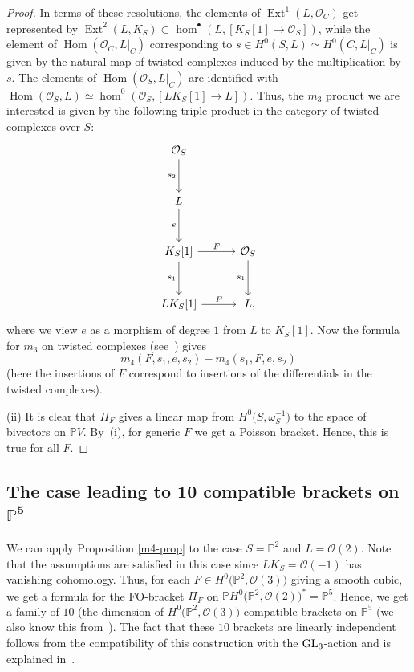 \documentclass[pdftex]{sigma}
\numberwithin{equation}{section}
\renewcommand{\P}{{\mathbb P}}
\newcommand{\Hom}{\operatorname{Hom}}
\newcommand{\Ext}{\operatorname{Ext}}
\newcommand{\OO}{{\mathcal O}}
\newcommand{\sub}{\subset}
\newcommand{\om}{\omega}
\begin{document}
\begin{proof}
In terms of these resolutions, the elements of $\Ext^1(L,\OO_C)$ get represented by $\Ext^2(L,K_S)\sub \hom^\bullet(L,[K_S[1]\to \OO_S])$,
while the element of $\Hom(\OO_C,L|_C)$ corresponding to $s\in H^0(S,L)\simeq H^0(C,L|_C)$ is given by the natural map of twisted complexes
induced by the multiplication by~$s$. The elements of $\Hom(\OO_S,L|_C)$ are identified with $\Hom(\OO_S,L)\simeq \hom^0(\OO_S,[LK_S[1]\to L])$.
Thus, the $m_3$ product we are interested is given by the following triple product in the category of twisted complexes over $S$:
\[
\begin{tikzcd}[row sep=3em,column sep=3em]
\OO_S \arrow[d,"s_2"'] & \\
L \arrow[d,"e"'] & \\
K_S[1] \arrow[r,"F"]\arrow[d,"s_1"'] & \OO_S \arrow[d,"s_1"']\\
LK_S[1]\arrow[r,"F"] & \hphantom{,}L,
\end{tikzcd}
\]
where we view $e$ as a morphism of degree $1$ from $L$ to $K_S[1]$.
Now the formula for $m_3$ on twisted complexes (see~\cite[Section~7.6]{Keller}) gives
\[m_4(F,s_1,e,s_2)-m_4(s_1,F,e,s_2)\]
(here the insertions of $F$ correspond to insertions of the differentials in the twisted complexes).

(ii) It is clear that $\Pi_F$ gives a linear map from $H^0\big(S,\om_S^{-1}\big)$ to the space of bivectors on $\P V$. By~(i), for generic $F$ we get a Poisson bracket.
Hence, this is true for all $F$.
\end{proof}

\subsection[The case leading to 10 compatible brackets on P\^{}5]{The case leading to $\boldsymbol{10}$ compatible brackets on $\boldsymbol{\P^5}$}

We can apply Proposition \ref{m4-prop} to the case $S=\P^2$ and $L=\OO(2)$. Note that the assumptions are satisfied in this case since
$LK_S=\OO(-1)$ has vanishing cohomology. Thus, for each $F\in H^0\big(\P^2,\OO(3)\big)$ giving a smooth cubic, we get a formula for the FO-bracket
$\Pi_F$ on $\P H^0\big(\P^2,\OO(2)\big)^*=\P^5$.
Hence, we get a family of $10$ (the dimension of $H^0\big(\P^2,\OO(3)\big)$
compatible brackets on $\P^5$ (we also know this from~\cite[Proposition~4.7]{HP}). The fact that these $10$ brackets are linearly independent follows from the compatibility of this
construction with the ${\rm GL}_3$-action and is explained in~\cite[Proposition~4.7]{HP}.
\end{document}
